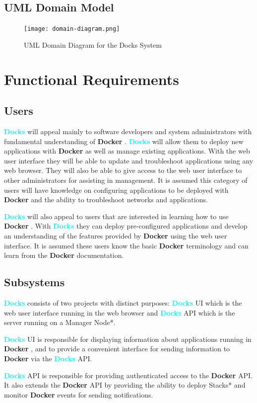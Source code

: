 \documentclass[]{article}
\newcommand{\docks}{\textbf{\textcolor{Cyan}{Docks}} }
\newcommand{\docker}{\textbf{\textcolor{OliveGreen}{Docker}} }
\begin{document}
\subsection{UML Domain Model}

\begin{figure}[H]
	\centering
	\texttt{[image: domain-diagram.png]}
	\caption{UML Domain Diagram for the Docks System}
\end{figure}

\section{Functional Requirements}

\subsection{Users}
\docks will appeal mainly to software developers and system administrators
with fundamental understanding of \docker. \docks will allow
them to deploy new applications with \docker as well as manage existing 
applications. With the web user interface they will be able to
update and troubleshoot applications using any web browser. They will
also be able to give access to the web user interface to other administrators
for assisting in management. It is assumed this category of users will
have knowledge on configuring applications to be deployed with \docker
and the ability to troubleshoot networks and applications.

\docks will also appeal to users that are interested in learning how
to use \docker. With \docks they can deploy pre-configured applications and
develop an understanding of the features provided by \docker using the 
web user interface. It is assumed these users know the basic \docker
terminology and can learn from the \docker documentation.

\subsection{Subsystems}
\docks consists of two projects with distinct purposes:
\docks UI which is the web user interface running in the web browser
and \docks API which is the server running on a Manager Node*.

\docks UI is responsible for displaying information about applications running
in \docker, and to provide a convenient interface for sending information
to \docker via the \docks API.

\docks API is responsible for providing authenticated access to the \docker API.
It also extends the \docker API by providing the ability to deploy Stacks*
and monitor \docker events for sending notifications.
\end{document}
